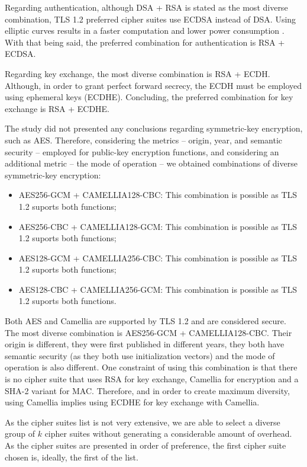 \documentclass{sig-alternate-05-2015}
\begin{document}
Regarding authentication, although DSA + RSA is stated as the most diverse combination, TLS 1.2 preferred cipher suites use ECDSA instead of DSA. Using elliptic curves results in a faster computation and lower power consumption \cite{Gupta02}. With that being said, the preferred combination for authentication is RSA + ECDSA.

Regarding key exchange, the most diverse combination is RSA + ECDH. Although, in order to grant perfect forward secrecy, the ECDH must be employed using ephemeral keys (ECDHE). Concluding, the preferred combination for key exchange is RSA + ECDHE.

The study did not presented any conclusions regarding symmetric-key encryption, such as AES. Therefore, considering the metrics -- origin, year, and semantic security -- employed for public-key encryption functions, and considering an additional metric -- the mode of operation -- we obtained combinations of diverse symmetric-key encryption:
\begin{itemize}
\item {AES256-GCM + CAMELLIA128-CBC: This combination is possible as TLS 1.2 suports both functions;}
\item {AES256-CBC + CAMELLIA128-GCM: This combination is possible as TLS 1.2 suports both functions;}
\item {AES128-GCM + CAMELLIA256-CBC: This combination is possible as TLS 1.2 suports both functions;}
\item {AES128-CBC + CAMELLIA256-GCM: This combination is possible as TLS 1.2 suports both functions.}
\end{itemize}

Both AES and Camellia are supported by TLS 1.2 and are considered secure. The most diverse combination is AES256-GCM + CAMELLIA128-CBC. Their origin is different, they were first published in different years, they both have semantic security (as they both use initialization vectors) and the mode of operation is also different. One constraint of using this combination is that there is no cipher suite that uses RSA for key exchange, Camellia for encryption and a SHA-2 variant for MAC. Therefore, and in order to create maximum diversity, using Camellia implies using ECDHE for key exchange with Camellia.

As the cipher suites list is not very extensive, we are able to select a diverse group of $k$ cipher suites without generating a considerable amount of overhead. As the cipher suites are presented in order of preference, the first cipher suite chosen is, ideally, the first of the list.
\end{document}
